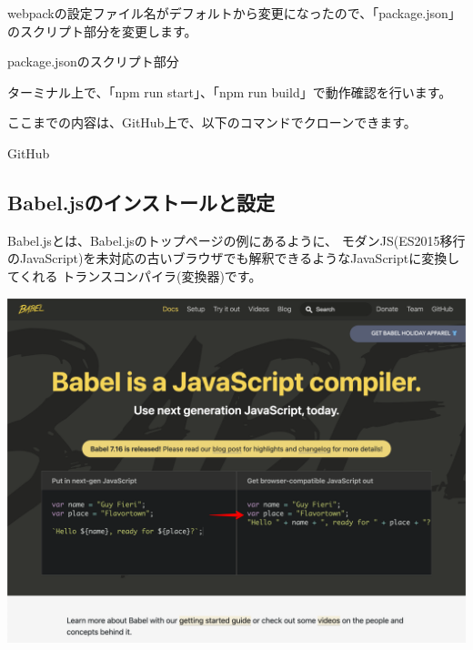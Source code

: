 webpackの設定ファイル名がデフォルトから変更になったので、「package.json」のスクリプト部分を変更します。

\def\startercodeblockfontsize{}
\begin{starterprogram}[]{package.jsonのスクリプト部分}\end{starterprogram}

ターミナル上で、「npm run start」、「npm run build」で動作確認を行います。

\begin{starternote}[]{}

ここまでの内容は、GitHub上で、以下のコマンドでクローンできます。

\def\startercodeblockfontsize{}
\begin{starterterminal}[]{GitHub}\end{starterterminal}
\end{starternote}

\clearpage


\subsection{Babel.jsのインストールと設定}
\keeplastskip{
  \label{sec:2-2-6}
  \label{sec04-babeljs}
  \par\nobreak
}

Babel.jsとは、Babel.jsのトップページの例にあるように、
モダンJS(ES2015移行のJavaScript)を未対応の古いブラウザでも解釈できるようなJavaScriptに変換してくれる
トランスコンパイラ(変換器)です。

\begin{reviewimage}[H]%
\includegraphics[width=0.9\maxwidth]{./images/02-create-react-app/babel01.png}%
\label{image:02-create-react-app:babel01}
\end{reviewimage}

